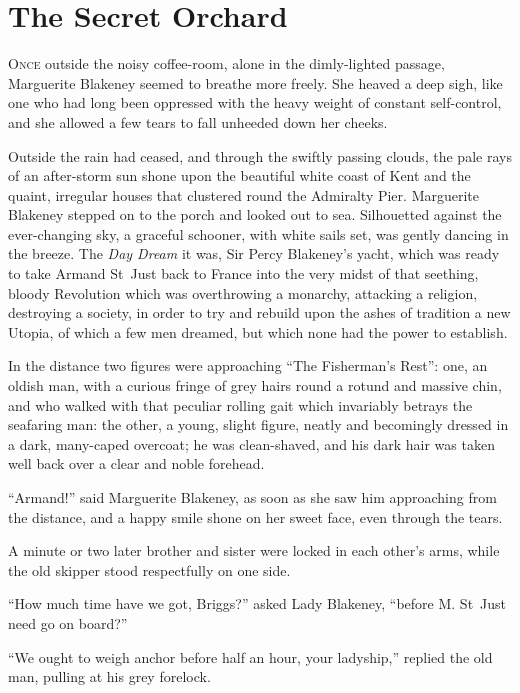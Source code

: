 
\chapter{The Secret Orchard}
\lettrine[lines=4]{O}{nce} outside the noisy coffee-room, alone in the dimly-lighted passage, Marguerite Blakeney  seemed to breathe more freely. She heaved a deep sigh, like one who had long been oppressed with the heavy weight of constant self-control, and she allowed a few tears to fall unheeded down her cheeks.

Outside the rain had ceased, and through the swiftly passing clouds, the pale rays of an after-storm sun shone upon the beautiful white coast of Kent and the quaint, irregular houses that clustered round the Admiralty Pier. Marguerite Blakeney stepped on to the porch and looked out to sea. Silhouetted against the ever-changing sky, a graceful schooner, with white sails set, was gently dancing in the breeze. The \textit{Day Dream} it was, Sir Percy Blakeney's yacht, which was ready to take Armand St~Just back to France into the very midst of that seething, bloody Revolution which was overthrowing a monarchy, attacking a religion, destroying a society, in order to try and rebuild upon the ashes of tradition a new Utopia, of which a few men dreamed, but which none had the power to establish.

In the distance two figures were approaching \enquote{The Fisherman's Rest}: one, an oldish man, with a curious fringe of grey hairs round a rotund and massive chin, and who walked with that peculiar rolling gait which invariably betrays the seafaring man: the other, a young, slight figure, neatly and becomingly dressed in a dark, many-caped overcoat; he was clean-shaved, and his dark hair was taken well back over a clear and noble forehead.

\enquote{Armand!} said Marguerite Blakeney, as soon as she saw him approaching from the distance, and a happy smile shone on her sweet face, even through the tears.

A minute or two later brother and sister were locked in each other's arms, while the old skipper stood respectfully on one side.

\enquote{How much time have we got, Briggs?} asked Lady Blakeney, \enquote{before M. St~Just need go on board?}

\enquote{We ought to weigh anchor before half an hour, your ladyship,} replied the old man, pulling at his grey forelock.

